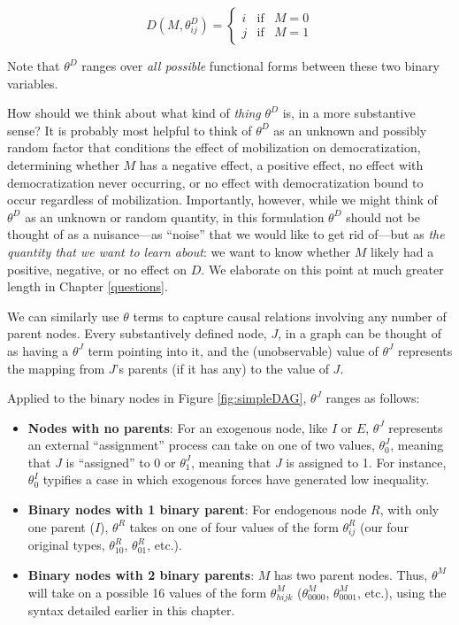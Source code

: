 \documentclass[
  12pt,
]{book}
\providecommand{\tightlist}{%
  \setlength{\itemsep}{0pt}\setlength{\parskip}{0pt}}
\begin{document}
\[D(M, \theta^D_{ij}) = \left\{\begin{array}{ccc} i & \text{if} & M=0 \\ j & \text{if} & M=1 \end{array}\right.\]

Note that \(\theta^D\) ranges over \emph{all possible} functional forms between these two binary variables.

How should we think about what kind of \emph{thing} \(\theta^D\) is, in a more substantive sense? It is probably most helpful to think of \(\theta^D\) as an unknown and possibly random factor that conditions the effect of mobilization on democratization, determining whether \(M\) has a negative effect, a positive effect, no effect with democratization never occurring, or no effect with democratization bound to occur regardless of mobilization. Importantly, however, while we might think of \(\theta^D\) as an unknown or random quantity, in this formulation \(\theta^D\) should not be thought of as a nuisance---as ``noise'' that we would like to get rid of---but as \emph{the quantity that we want to learn about}: we want to know whether \(M\) likely had a positive, negative, or no effect on \(D\). We elaborate on this point at much greater length in Chapter \ref{questions}.

We can similarly use \(\theta\) terms to capture causal relations involving any number of parent nodes. Every substantively defined node, \(J\), in a graph can be thought of as having a \(\theta^J\) term pointing into it, and the (unobservable) value of \(\theta^J\) represents the mapping from \(J\)'s parents (if it has any) to the value of \(J\).

Applied to the binary nodes in Figure \ref{fig:simpleDAG}, \(\theta^J\) ranges as follows:

\begin{itemize}
\tightlist
\item
  \textbf{Nodes with no parents}: For an exogenous node, like \(I\) or \(E\), \(\theta^J\) represents an external ``assignment'' process can take on one of two values, \(\theta^J_{0}\), meaning that \(J\) is ``assigned'' to \(0\) or \(\theta^J_{1}\), meaning that \(J\) is assigned to 1. For instance, \(\theta^I_{0}\) typifies a case in which exogenous forces have generated low inequality.
\item
  \textbf{Binary nodes with 1 binary parent}: For endogenous node \(R\), with only one parent (\(I\)), \(\theta^R\) takes on one of four values of the form \(\theta^R_{ij}\) (our four original types, \(\theta^R_{10}\), \(\theta^R_{01}\), etc.).
\item
  \textbf{Binary nodes with 2 binary parents}: \(M\) has two parent nodes. Thus, \(\theta^M\) will take on a possible 16 values of the form \(\theta^M_{hijk}\) (\(\theta^M_{0000}\), \(\theta^M_{0001}\), etc.), using the syntax detailed earlier in this chapter.
\end{itemize}
\end{document}
